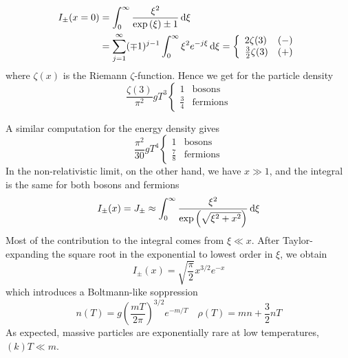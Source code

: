 \begin{align*}
    I_{\pm}(x=0) &= \int_{0}^{\infty} \frac{\xi^{2}}{\exp\left(\xi\right)\pm 1}\,\text{d}\xi \\
    &= \sum_{j=1}^{\infty} (\mp 1)^{j-1}\int_{0}^{\infty}\xi^{2}e^{-j\xi}\,\text{d}\xi =
    \left\{
        \begin{array}{ll}
            2\zeta(3) & (-)\\
            \frac{3}{2}\zeta(3) & (+)
        \end{array}
    \right.
\end{align*}
where $\zeta(x)$ is the Riemann $\zeta$-function. Hence we get for the particle density
\begin{equation}
    \boxed{
        \frac{\zeta(3)}{\pi^{2}}gT^{3} \left\{
            \begin{array}{ll}
                1 & \text{bosons}\\
                \frac{3}{4} & \text{fermions}
            \end{array}
        \right.
    }
    \label{eq:pd-ultrarel}
\end{equation}

\par A similar computation for the energy density gives
\begin{equation}
    \boxed{
        \frac{\pi^{2}}{30}gT^{4} \left\{
            \begin{array}{ll}
                1 & \text{bosons}\\
                \frac{7}{8} & \text{fermions}
            \end{array}
        \right.
    }
    \label{eq:ed-ultrarel}
\end{equation}
In the non-relativistic limit, on the other hand, we have $x \gg 1$, and the integral is the same for both bosons and fermions
\begin{equation}
    I_{\pm}(x) = J_{\pm} \approx \int_{0}^{\infty} \frac{\xi^{2}}{\exp\left(\sqrt{\xi^{2}+x^{2}}\right)}\,\text{d}\xi
\end{equation}
Most of the contribution to the integral comes from $\xi \ll x$. After Taylor-expanding the square root in the exponential to lowest order in $\xi$, we obtain
\begin{equation}
    I_{\pm}(x) = \sqrt{\frac{\pi}{2}} x^{3/2}e^{-x}
\end{equation}
which introduces a Boltmann-like soppression 
\begin{equation}
    n(T) = g\left(\frac{mT}{2\pi}\right)^{3/2}e^{-m/T} \quad \rho(T) = mn + \frac{3}{2}nT
\end{equation}
As expected, massive particles are exponentially rare at low temperatures, $(k)T \ll m$.

